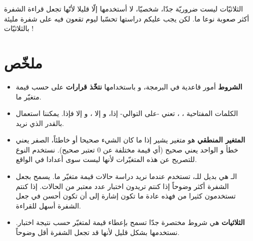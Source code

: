 الثلاثيّات ليست ضروريّة جدّا، شخصيّا، لا أستخدمها إلّا قليلا لأنّها تجعل قراءة الشفرة أكثر صعوبة نوعا ما. لكن يجب عليكم دراستها تحسّبا ليوم تقعون فيه على شفرة مليئة بالثلاثيّات !

\section*{ملخّص}

\begin{itemize}
	\item \textbf{الشروط}
	أمور قاعدية في البرمجة، و باستخدامها 
	\textbf{نتخّذ قرارات}
	 على حسب قيمة متغيّر ما.
	\item الكلمات المفتاحية
	 ،
	 ،
	 تعني -على التوالي- إذا، و إلا ، و إلا فإذا. يمكننا استعمال
	 بالقدر الذي نريد.
	 \item \textbf{المتغير المنطقي}
	 هو متغير يشير إذا ما كان الشيء صحيحا أو خاطئاً، الصفر يعني خطأ و الواحد يعني صحيح (أي قيمة مختلفة عن 0 تعتبر صحيح). نستخدم النوع
	 للتصريح عن هذه المتغيّرات لأنها ليست سوى أعدادا في الواقع.
	 \item الـ
	 هي بديل للـ،
	  تستخدم عندما نريد دراسة حالات قيمة متغيّر ما. يسمح بجعل الشفرة أكثر وضوحاً إذا كنتم تريدون اختبار عدد معتبر من الحالات. إذا كنتم تستخدمون كثيرا من
	 فهذه عادة ما تكون إشارة إلى أن 
	 تكون أحسن في جعل الشفرة أسهل للقراءة.
	 \item \textbf{الثلاثيات} 
	 هي شروط مختصرة جدّا تسمح بإعطاء قيمة لمتغيّر حسب نتيجة اختبار. نستخدمها بشكل قليل لأنها قد تجعل الشفرة أقل وضوحاً.
\end{itemize}
